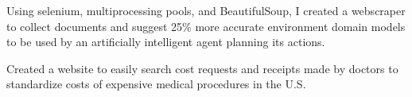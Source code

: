 \documentclass[]{deedy-resume-openfont}
\begin{document}
\begin{minipage}[t]{0.66\textwidth}
\begin{tightemize}
\item Using selenium, multiprocessing pools, and BeautifulSoup, I created a webscraper to collect documents and suggest 25\% more accurate environment domain models to be used by an artificially intelligent agent planning its actions.
\end{tightemize}
\sectionsep

\begin{tightemize}
\item Created a website to easily search cost requests and receipts made by doctors to standardize costs of expensive medical procedures in the U.S.
\end{tightemize}

\end{minipage}
\end{document}
